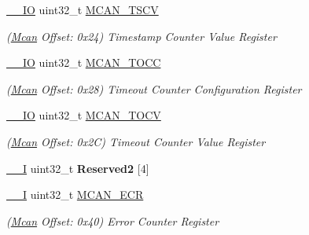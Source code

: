 \begin{DoxyCompactItemize}
\mbox{\label{structMcan_aa56b44889dc925861bbb3d30ab073db0}} 
\mbox{\hyperlink{core__cm7_8h_aec43007d9998a0a0e01faede4133d6be}{\+\_\+\+\_\+\+IO}} uint32\+\_\+t \mbox{\hyperlink{structMcan_aa56b44889dc925861bbb3d30ab073db0}{M\+C\+A\+N\+\_\+\+T\+S\+CV}}
\begin{DoxyCompactList}\small\item\em (\mbox{\hyperlink{structMcan}{Mcan}} Offset\+: 0x24) Timestamp Counter Value Register \end{DoxyCompactList}\item 
\mbox{\label{structMcan_a5caaa33e4f25d39af7ab47b101d4f45c}} 
\mbox{\hyperlink{core__cm7_8h_aec43007d9998a0a0e01faede4133d6be}{\+\_\+\+\_\+\+IO}} uint32\+\_\+t \mbox{\hyperlink{structMcan_a5caaa33e4f25d39af7ab47b101d4f45c}{M\+C\+A\+N\+\_\+\+T\+O\+CC}}
\begin{DoxyCompactList}\small\item\em (\mbox{\hyperlink{structMcan}{Mcan}} Offset\+: 0x28) Timeout Counter Configuration Register \end{DoxyCompactList}\item 
\mbox{\label{structMcan_a055c0102684acd7cd356fcc285bc000b}} 
\mbox{\hyperlink{core__cm7_8h_aec43007d9998a0a0e01faede4133d6be}{\+\_\+\+\_\+\+IO}} uint32\+\_\+t \mbox{\hyperlink{structMcan_a055c0102684acd7cd356fcc285bc000b}{M\+C\+A\+N\+\_\+\+T\+O\+CV}}
\begin{DoxyCompactList}\small\item\em (\mbox{\hyperlink{structMcan}{Mcan}} Offset\+: 0x2C) Timeout Counter Value Register \end{DoxyCompactList}\item 
\mbox{\label{structMcan_a435c3bc0e244688aec8ea41c882e37c3}} 
\mbox{\hyperlink{core__cm7_8h_af63697ed9952cc71e1225efe205f6cd3}{\+\_\+\+\_\+I}} uint32\+\_\+t {\bfseries Reserved2} \mbox{[}4\mbox{]}
\item 
\mbox{\label{structMcan_a4412882e3359de427209547daa698bce}} 
\mbox{\hyperlink{core__cm7_8h_af63697ed9952cc71e1225efe205f6cd3}{\+\_\+\+\_\+I}} uint32\+\_\+t \mbox{\hyperlink{structMcan_a4412882e3359de427209547daa698bce}{M\+C\+A\+N\+\_\+\+E\+CR}}
\begin{DoxyCompactList}\small\item\em (\mbox{\hyperlink{structMcan}{Mcan}} Offset\+: 0x40) Error Counter Register \end{DoxyCompactList}\item 

\end{DoxyCompactItemize}
